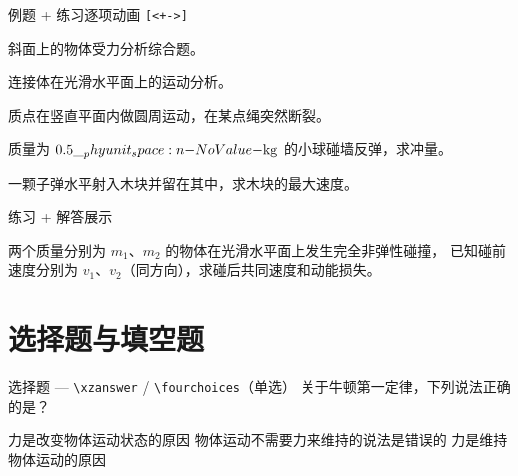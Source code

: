 \documentclass[darkmode=false, randomquote=true, quoteseed=2026, shownav=false,handout=false]{HiBeamer}
\begin{document}
\begin{frame}{例题 + 练习逐项动画 \texttt{[<+->]}}
  \begin{ExampleList}[<+->]
    \item 斜面上的物体受力分析综合题。
    \item 连接体在光滑水平面上的运动分析。
    \item 质点在竖直平面内做圆周运动，在某点绳突然断裂。
  \end{ExampleList}

  \begin{ExerciseList}[<+->]
    \item 质量为 $0.5\Ukg$ 的小球碰墙反弹，求冲量。
    \item 一颗子弹水平射入木块并留在其中，求木块的最大速度。
  \end{ExerciseList}
\end{frame}

\begin{frame}{练习 + 解答展示}
  \begin{ExerciseList}

    \item 两个质量分别为 $m_1$、$m_2$ 的物体在光滑水平面上发生完全非弹性碰撞，
          已知碰前速度分别为 $v_1$、$v_2$（同方向），求碰后共同速度和动能损失。

  \end{ExerciseList}
\end{frame}

\section{选择题与填空题}

\begin{frame}{选择题 --- \texttt{\textbackslash xzanswer} / \texttt{\textbackslash fourchoices}（单选）}
  关于牛顿第一定律，下列说法正确的是？ 

    {力是改变物体运动状态的原因}
    {物体运动不需要力来维持的说法是错误的}
    {力是维持物体运动的原因}
\end{frame}
\end{document}
